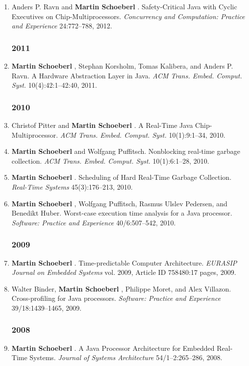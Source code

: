 \begin{enumerate}
\item Anders P. Ravn and {\bf Martin Schoeberl }.
 Safety-Critical Java with Cyclic Executives on Chip-Multiprocessors.
 \emph{Concurrency and Computation: Practice and Experience} 24:772--788, 2012.


\subsubsection*{2011}

\item {\bf Martin Schoeberl }, Stephan Korsholm, Tomas Kalibera, and Anders P. Ravn.
 A Hardware Abstraction Layer in Java.
 \emph{ACM Trans. Embed. Comput. Syst.} 10(4):42:1--42:40, 2011.


\subsubsection*{2010}

\item Christof Pitter and {\bf Martin Schoeberl }.
 A Real-Time Java Chip-Multiprocessor.
 \emph{ACM Trans. Embed. Comput. Syst.} 10(1):9:1--34, 2010.

\item {\bf Martin Schoeberl } and Wolfgang Puffitsch.
 Nonblocking real-time garbage collection.
 \emph{ACM Trans. Embed. Comput. Syst.} 10(1):6:1--28, 2010.

\item {\bf Martin Schoeberl }.
 Scheduling of Hard Real-Time Garbage Collection.
 \emph{Real-Time Systems} 45(3):176--213, 2010.

\item {\bf Martin Schoeberl }, Wolfgang Puffitsch, Rasmus Ulslev Pedersen, and Benedikt Huber.
 Worst-case execution time analysis for a Java processor.
 \emph{Software: Practice and Experience} 40/6:507--542, 2010.


\subsubsection*{2009}

\item {\bf Martin Schoeberl }.
 Time-predictable Computer Architecture.
 \emph{EURASIP Journal on Embedded Systems} vol. 2009, Article ID 758480:17 pages, 2009.

\item Walter Binder, {\bf Martin Schoeberl }, Philippe Moret, and Alex Villazon.
 Cross-profiling for Java processors.
 \emph{Software: Practice and Experience} 39/18:1439--1465, 2009.


\subsubsection*{2008}

\item {\bf Martin Schoeberl }.
 A Java Processor Architecture for Embedded Real-Time Systems.
 \emph{Journal of Systems Architecture} 54/1--2:265--286, 2008.


\end{enumerate}

